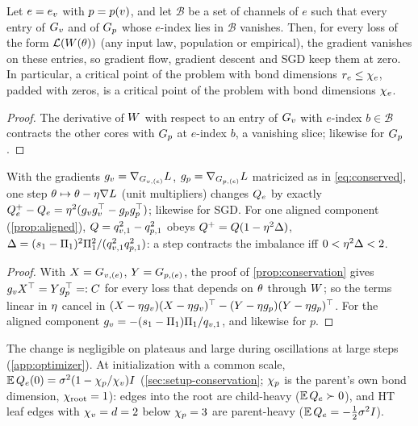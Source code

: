 \begin{lemma}\label{lem:A-unused}
  \proven{} 
  Let $e=e_{v}$ with $p=p(v)$, and let $\mathcal B$ be a set of channels of $e$ such that every
  entry of $G_{v}$ and of $G_{p}$ whose $e$-index lies in $\mathcal B$ vanishes. Then, for every loss
  of the form $\mathcal L(W(\theta))$ (any input law, population or empirical), the gradient
  vanishes on these entries, so gradient flow, gradient descent and SGD keep them at zero. In
  particular, a critical point of the problem with bond dimensions $r_e\le\chi_{e}$, padded with zeros,
  is a critical point of the problem with bond dimensions $\chi_{e}$.
\end{lemma}
\begin{proof}
  The derivative of $W$ with respect to an entry of $G_{v}$ with $e$-index $b\in\mathcal B$ contracts the
  other cores with $G_{p}$ at $e$-index $b$, a vanishing slice; likewise for $G_{p}$.
\end{proof}

\begin{lemma}\label{lem:A-gd-identity}
  \proven{} 
  With the gradients $g_v=\nabla_{G_{v,(e)}}L$, $g_p=\nabla_{G_{p,(e)}}L$ matricized as in \eqref{eq:conserved},
  one step $\theta\mapsto\theta-\eta\nabla L$ (unit multipliers) changes $Q_{e}$ by exactly
  $Q_{e}^{+}-Q_{e}=\eta^2(g_vg_v^{\top}-g_pg_p^{\top})$; likewise for SGD. For one aligned component (\cref{prop:aligned}), $Q=q_{v,1}^2-q_{p,1}^2$ obeys
  $Q^{+}=Q(1-\eta^2\Delta)$, $\Delta=(s_{1}-\Pi_{1})^2\Pi_{1}^2/(q_{v,1}^2q_{p,1}^2)$: a step contracts the imbalance iff $0<\eta^2\Delta<2$.
\end{lemma}
\begin{proof}
  With $X=G_{v,(e)}$, $Y=G_{p,(e)}$, the proof of \cref{prop:conservation} gives $g_vX^{\top}=Yg_p^{\top}=:C$ for
  every loss that depends on $\theta$ through $W$; so the terms linear in $\eta$ cancel in
  $(X-\eta g_v)(X-\eta g_v)^{\top}-(Y-\eta g_p)(Y-\eta g_p)^{\top}$. For the aligned component
  $g_v=-(s_{1}-\Pi_{1})\Pi_{1}/q_{v,1}$, and likewise for $p$.
\end{proof}
The change is negligible on plateaus and large during oscillations at large steps (\cref{app:optimizer}).
At initialization with a common scale,
$\mathbb{E}\,Q_{e}(0)=\sigma^2(1-\chi_{p}/\chi_{v})I$ (\cref{sec:setup-conservation}; $\chi_{p}$ is the parent's own bond
dimension, $\chi_{\mathrm{root}}=1$): edges into the root are child-heavy ($\mathbb{E}\,Q_{e}\succ0$), and HT leaf edges with
$\chi_{v}=d=2$ below $\chi_{p}=3$ are parent-heavy ($\mathbb{E}\,Q_{e}=-\tfrac12\sigma^2I$).

